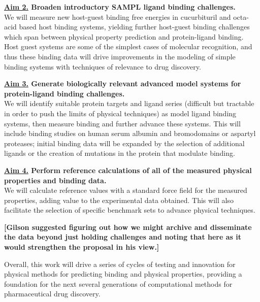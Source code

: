 \documentclass[11pt]{article}
\begin{document}
{\bf \underline{Aim 2.} Broaden introductory SAMPL ligand binding challenges.}\\
We will measure new host-guest binding free energies in cucurbituril and octa-acid based host binding systems, yielding further host-guest binding challenges which span between physical property prediction and protein-ligand binding. 
Host guest systems are some of the simplest cases of molecular recognition, and thus these binding data will drive improvements in the modeling of simple binding systems with techniques of relevance to drug discovery.

{\bf \underline{Aim 3.} Generate biologically relevant advanced model systems for protein-ligand binding challenges.}\\
We will identify suitable protein targets and ligand series (difficult but tractable in order to push the limits of physical techniques) as model ligand binding systems, then measure binding and further advance these systems. 
This will include binding studies on human serum albumin and bromodomains or aspartyl proteases; initial binding data will be expanded by the selection of additional ligands or the creation of mutations in the protein that modulate binding.

{\bf \underline{Aim 4.} Perform reference calculations of all of the measured physical properties and binding data.} \\
We will calculate reference values with a standard force field for the measured properties, adding value to the experimental data obtained.
This will also facilitate the selection of specific benchmark sets to advance physical techniques.

{\bf [Gilson suggested figuring out how we might archive and disseminate the data beyond just holding challenges and noting that here as it would strengthen the proposal in his view.]}

Overall, this work will drive a series of cycles of testing and innovation for physical methods for predicting binding and physical properties, providing a foundation for the next several generations of computational methods for pharmaceutical drug discovery. 
\end{document}
